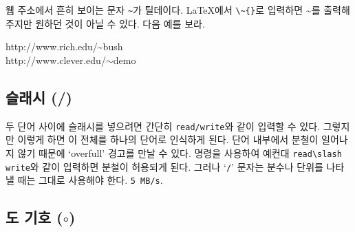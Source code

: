 웹 주소에서 흔히 보이는 문자 \verb|~|가 틸데이다. \LaTeX 에서 \verb|\~{}|로 입력하면
\~{}를 출력해주지만 원하던 것이 아닐 수 있다. 다음 예를 보라.

\begin{example}
http://www.rich.edu/\~{}bush \\
http://www.clever.edu/$\sim$demo
\end{example}

\subsection{슬래시 (/)} 

두 단어 사이에 슬래시를 넣으려면 간단히 \texttt{read/write}와 같이 입력할 수 있다.
그렇지만 이렇게 하면 이 전체를 하나의 단어로 인식하게 된다. 단어 내부에서 분철이 일어나지 않기 
때문에 `overfull' 경고를 만날 수 있다.  명령을 사용하여 예컨대 \verb|read\slash write|와 
같이 입력하면 분철이 허용되게 된다. 그러나 `\texttt{/}' 문자는 분수나 단위를 나타낼 때는 
그대로 사용해야 한다.
\texttt{5 MB/s}.

\subsection{도 기호 \texorpdfstring{($\circ$)}{}}

